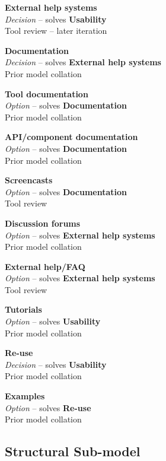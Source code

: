 \textbf{External help systems} \\ \emph{Decision} -- solves \textbf{Usability} \\ Tool review  -- later iteration

\textbf{Documentation} \\ \emph{Decision} -- solves \textbf{External help systems} \\ Prior model collation \cite{Grammel2010}

\textbf{Tool documentation} \\ \emph{Option} -- solves \textbf{Documentation} \\ Prior model collation \cite{Grammel2010}

\textbf{API/component documentation} \\ \emph{Option} -- solves \textbf{Documentation} \\ Prior model collation \cite{Grammel2010}

\textbf{Screencasts} \\ \emph{Option} -- solves \textbf{Documentation} \\ Tool review

\textbf{Discussion forums} \\ \emph{Option} -- solves \textbf{External help systems} \\ Prior model collation \cite{Grammel2010}

\textbf{External help/FAQ} \\ \emph{Option} -- solves \textbf{External help systems} \\ Tool review

\textbf{Tutorials} \\ \emph{Option} -- solves \textbf{Usability} \\ Prior model collation \cite{Grammel2010,Minhas2012}


\textbf{Re-use} \\ \emph{Decision} -- solves \textbf{Usability} \\ Prior model collation \cite{Grammel2010}

\textbf{Examples} \\ \emph{Option} -- solves \textbf{Re-use} \\ Prior model collation \cite{Grammel2010}

\subsection{Structural Sub-model}

